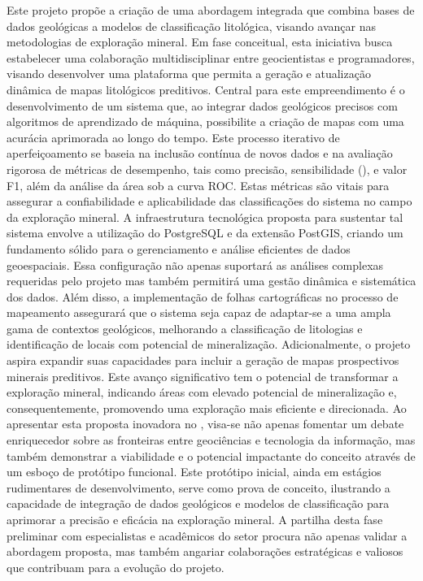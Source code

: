 \documentclass[11pt]{article} %
\begin{document}
\par{Este projeto propõe a criação de uma abordagem integrada que combina bases de dados
geológicas a modelos de classificação litológica, visando avançar nas
metodologias de exploração mineral. Em fase conceitual, esta iniciativa busca estabelecer
uma colaboração multidisciplinar entre geocientistas e programadores, visando
desenvolver uma plataforma que permita a geração e atualização dinâmica de mapas
litológicos preditivos. Central para este empreendimento é o desenvolvimento de um
sistema que, ao integrar dados geológicos precisos com algoritmos de aprendizado de
máquina, possibilite a criação de mapas com uma acurácia aprimorada ao longo do tempo.
Este processo iterativo de aperfeiçoamento se baseia na inclusão contínua de novos dados
e na avaliação rigorosa de métricas de desempenho, tais como precisão, sensibilidade
(), e valor F1, além da análise da área sob a curva ROC. Estas métricas são vitais
para assegurar a confiabilidade e aplicabilidade das classificações do sistema no campo
da exploração mineral. A infraestrutura tecnológica proposta para sustentar tal sistema
envolve a utilização do PostgreSQL e da extensão PostGIS, criando um fundamento sólido
para o gerenciamento e análise eficientes de dados geoespaciais. Essa configuração não
apenas suportará as análises complexas requeridas pelo projeto mas também permitirá
uma gestão dinâmica e sistemática dos dados. Além disso, a implementação de folhas
cartográficas no processo de mapeamento assegurará que o sistema seja capaz de
adaptar-se a uma ampla gama de contextos geológicos, melhorando a classificação de
litologias e identificação de locais com potencial de mineralização. Adicionalmente, o
projeto aspira expandir suas capacidades para incluir a geração de mapas prospectivos
minerais preditivos. Este avanço significativo tem o potencial de transformar a exploração
mineral, indicando áreas com elevado potencial de mineralização e, consequentemente,
promovendo uma exploração mais eficiente e direcionada. Ao apresentar esta proposta
inovadora no , visa-se não apenas fomentar um debate
enriquecedor sobre as fronteiras entre geociências e tecnologia da informação, mas
também demonstrar a viabilidade e o potencial impactante do conceito através de um
esboço de protótipo funcional. Este protótipo inicial, ainda em estágios rudimentares de
desenvolvimento, serve como prova de conceito, ilustrando a capacidade de integração de
dados geológicos e modelos de classificação para aprimorar a precisão e eficácia na
exploração mineral. A partilha desta fase preliminar com especialistas e acadêmicos do
setor procura não apenas validar a abordagem proposta, mas também angariar
colaborações estratégicas e  valiosos que contribuam para a evolução do projeto.}
\end{document}
